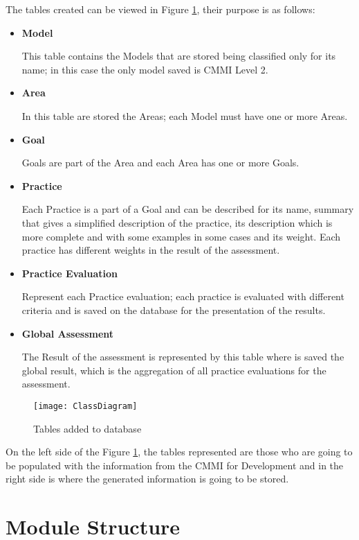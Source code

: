 The tables created can be viewed in Figure \ref{fig:database}, their purpose is as follows:
\begin{itemize}
	\item \textbf{Model}
	
	This table contains the Models that are stored being classified only for its name; in this case the only model saved is CMMI Level 2.
	\item \textbf{Area}
	
	In this table are stored the Areas; each Model must have one or more Areas.
	\item \textbf{Goal}
	
	Goals are part of the Area and each Area has one or more Goals.
	\item \textbf{Practice}
	
	Each Practice is a part of a Goal and can be described for its name, summary that gives a simplified description of the practice, its description which is more complete and with some examples in some cases and its weight. Each practice has different weights in the result of the assessment.
	
	\item \textbf{Practice Evaluation}
	
	Represent each Practice evaluation; each practice is evaluated with different criteria and is saved on the database for the presentation of the results.
	
	\item \textbf{Global Assessment}
	
	The Result of the assessment is represented by this table where is saved the global result, which is the aggregation of all practice evaluations for the assessment.
	
\end{itemize}

\begin{figure}[!htb]
	\begin{center}
		\leavevmode
		\texttt{[image: ClassDiagram]}
		\caption{Tables added to database}
		\label{fig:database}
	\end{center}
\end{figure}


On the left side of the Figure \ref{fig:database}, the tables represented are those who are going to be populated with the information from the CMMI for Development and in the right side is where the generated information is going to be stored.


\section{Module Structure}

